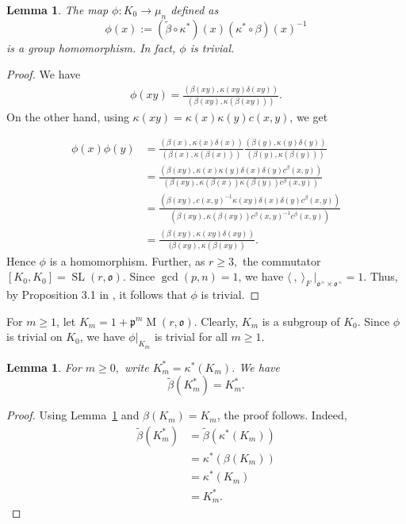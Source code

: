 \documentclass[11pt, a4paper, reqno]{amsart}
\newtheorem{lemma}[theorem]{Lemma}
\theoremstyle{definition}
\theoremstyle{remark}
\theoremstyle{example}
\theoremstyle{note}
\numberwithin{equation}{section}
\DeclareMathOperator{\SL}{SL}
\DeclareMathOperator{\M}{M}
\begin{document}
\begin{lemma}\label{phi is trivial}
The map $\phi:K_0 \longrightarrow \mu_n$ defined as $$\phi(x):= (\tilde{\beta} \circ \kappa^*)(x)(\kappa^*\circ \beta)(x) ^{-1}$$ is a group homomorphism. In fact, $\phi$ is trivial.
\end{lemma}

\begin{proof} We have
    \begin{align*}
    \phi(xy) = \frac{(\beta(xy), \kappa(xy) \delta(xy))}{(\beta(xy), \kappa(\beta(xy)))}.
    \end{align*}
On the other hand, using $\kappa(xy)=\kappa(x)\kappa(y)c(x,y)$, we get

    \begin{align*}
        \phi(x)\phi(y) 
        &=\frac{(\beta(x), \kappa(x) \delta(x))}{(\beta(x), \kappa(\beta(x)))} \frac{(\beta(y), \kappa(y) \delta(y))}{(\beta(y), \kappa(\beta(y)))}\\[2pt]
        &= \frac{(\beta(xy), \kappa(x)\kappa(y) \delta(x) \delta(y) c^\beta(x,y))}{(\beta(xy), \kappa(\beta(x))\kappa(\beta(y)) c^\beta(x,y))}\\[2pt]
        &= \frac{(\beta(xy), c(x,y)^{-1} \kappa(xy) \delta(x) \delta(y) c^\beta(x,y))}{(\beta(xy), \kappa(\beta(xy)) c^\beta(x,y)^{-1}c^\beta(x,y))}\\[2pt]
        &=\frac{(\beta(xy), \kappa(xy) \delta(xy))}{(\beta(xy), \kappa(\beta(xy))}.
    \end{align*}
Hence $\phi$ is a homomorphism. Further,  as $r \geq 3,$  the commutator $[K_0,K_0]=\SL(r, \mathfrak{o})$. 
Since $\gcd (p,n)=1$, we have $\langle \ , \ \rangle_{F} ~\big |_{\mathfrak{o}^{\times} \times \mathfrak{o}^{\times}}=1$. Thus, by Proposition 3.1 in \cite{KazPat}, it follows that $\phi$ is trivial.
\end{proof}
For $m \geq 1$, let $K_m=1+\mathfrak{p}^{m}\M(r, \mathfrak{o})$. Clearly, $K_{m}$ is a subgroup of $K_0$. Since $\phi$ is trivial on $K_{0}$, we have $\phi|_{K_{m}}$ is trivial for all $m \geq 1$. 

\begin{lemma}\label{betatildefixesKm} For $m \geq 0,$ write $K_m^* = \kappa^*(K_m)$. We have $$\tilde{\beta}(K_m^*)=K_m^*.$$
\end{lemma}

\begin{proof} Using Lemma~\ref{phi is trivial} and $\beta(K_{m})=K_{m}$, the proof follows. Indeed,
   \begin{align*}
       \tilde{\beta}(K_m^*) &= \tilde{\beta}(\kappa^*(K_m))\\
       &= \kappa^*(\beta(K_m))\\
       &= \kappa^*(K_m)\\
       &= K_m^*. 
   \end{align*}
\end{proof}
\end{document}
